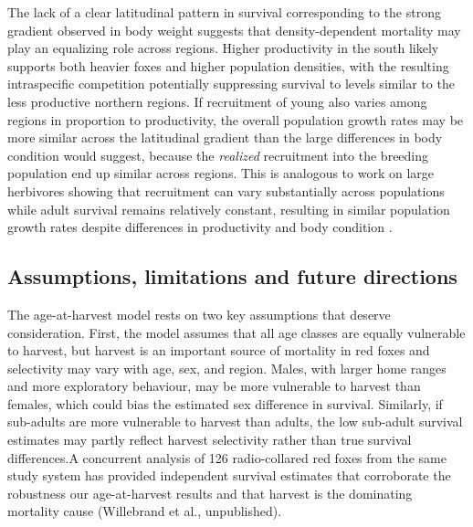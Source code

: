 \documentclass[12pt,a4paper,final,abstract=true,headings=small]{scrartcl}
\begin{document}
The lack of a clear latitudinal pattern in survival corresponding to the strong gradient observed in body weight suggests that density-dependent mortality may play an equalizing role across regions. Higher productivity in the south likely supports both heavier foxes and higher population densities, with the resulting intraspecific competition potentially suppressing survival to levels similar to the less productive northern regions. If recruitment of young also varies among regions in proportion to productivity, the overall population growth rates may be more similar across the latitudinal gradient than the large differences in body condition would suggest, because the \emph{realized} recruitment into the breeding population  end up similar across regions. This is analogous to work on large herbivores showing that recruitment can vary substantially across populations while adult survival remains relatively constant, resulting in similar population growth rates despite differences in productivity and body condition \citep{gaillardTemporalVariationFitness2000}.

\subsection*{Assumptions, limitations and future directions}

The age-at-harvest model rests on two key assumptions that deserve consideration. First, the model assumes that all age classes are equally vulnerable to harvest, but harvest is an important source of mortality in red foxes and selectivity may vary with age, sex, and region. Males, with larger home ranges and more exploratory behaviour, may be more vulnerable
to harvest than females, which could bias the estimated sex difference in survival. Similarly, if sub-adults are more vulnerable to harvest than adults, the low sub-adult survival estimates may partly reflect harvest selectivity rather than true survival differences.A concurrent analysis of 126 radio-collared red foxes from the same study system has provided independent survival estimates that corroborate the robustness our age-at-harvest results and that harvest is the dominating mortality cause (Willebrand et al., unpublished).
\end{document}
